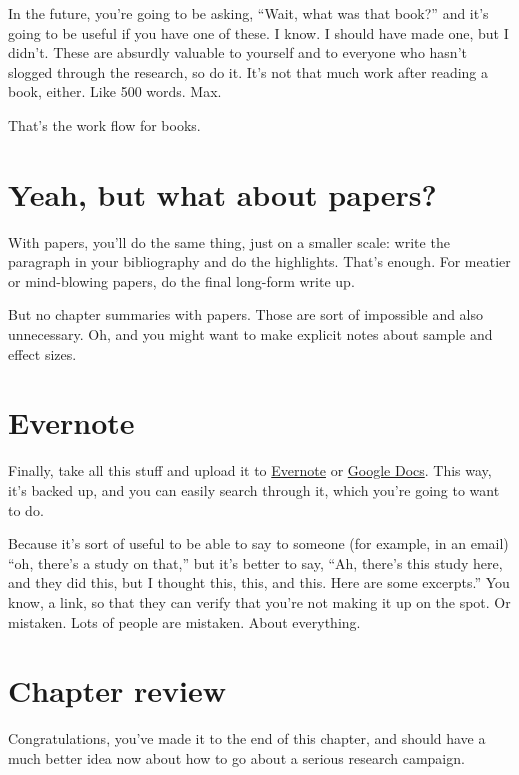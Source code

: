 In the future, you're going to be asking, ``Wait, what was that book?'' and it's
going to be useful if you have one of these. I know. I should have made one, but
I didn't. These are absurdly valuable to yourself and to everyone who hasn't
slogged through the research, so do it. It's not that much work after reading a
book, either. Like 500 words. Max.

That's the work flow for books.

\section{Yeah, but what about papers?}

With papers, you'll do the same thing, just on a smaller scale: write the
paragraph in your bibliography and do the highlights. That's enough. For meatier or mind-blowing papers, do the final long-form write up.

But no chapter summaries with papers. Those are sort of impossible and also
unnecessary. Oh, and you might want to make explicit notes about sample and
effect sizes.

\section{Evernote}

Finally, take all this stuff and upload it to \href{https://evernote.com/}{Evernote} or \href{http://docs.google.com}{Google Docs}. This way,
it's backed up, and you can easily search through it, which you're going to want
to do.

Because it's sort of useful to be able to say to someone (for example, in an email)
``oh, there's a study on that,'' but it's better to say, ``Ah,
there's this study here, and they did this, but I thought this, this, and
this. Here are some excerpts.'' You know, a link, so that they can verify that you're not making it up
on the spot. Or mistaken. Lots of people are mistaken. About everything.


\section{Chapter review}

Congratulations, you've made it to the end of this chapter, and should
have a much better idea now about how to go about a serious research campaign.

